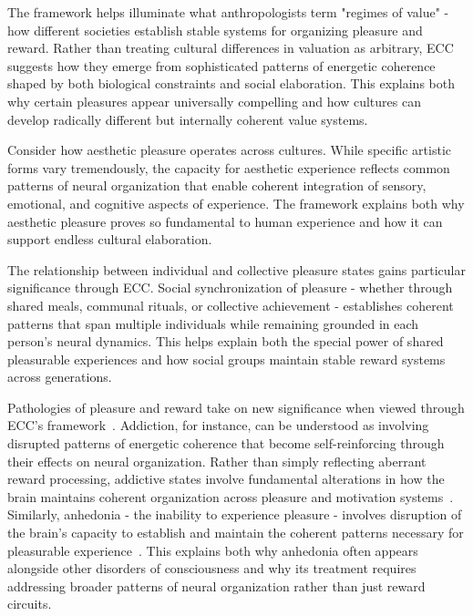 The framework helps illuminate what anthropologists term "regimes of value" - how different societies establish stable systems for organizing pleasure and reward. Rather than treating cultural differences in valuation as arbitrary, ECC suggests how they emerge from sophisticated patterns of energetic coherence shaped by both biological constraints and social elaboration. This explains both why certain pleasures appear universally compelling and how cultures can develop radically different but internally coherent value systems.

Consider how aesthetic pleasure operates across cultures. While specific artistic forms vary tremendously, the capacity for aesthetic experience reflects common patterns of neural organization that enable coherent integration of sensory, emotional, and cognitive aspects of experience. The framework explains both why aesthetic pleasure proves so fundamental to human experience and how it can support endless cultural elaboration.

The relationship between individual and collective pleasure states gains particular significance through ECC. Social synchronization of pleasure - whether through shared meals, communal rituals, or collective achievement - establishes coherent patterns that span multiple individuals while remaining grounded in each person's neural dynamics. This helps explain both the special power of shared pleasurable experiences and how social groups maintain stable reward systems across generations.

Pathologies of pleasure and reward take on new significance when viewed through ECC's framework~\cite{Girdhar2025}. Addiction, for instance, can be understood as involving disrupted patterns of energetic coherence that become self-reinforcing through their effects on neural organization. Rather than simply reflecting aberrant reward processing, addictive states involve fundamental alterations in how the brain maintains coherent organization across pleasure and motivation systems~\cite{levin2020revisiting}. Similarly, anhedonia - the inability to experience pleasure - involves disruption of the brain's capacity to establish and maintain the coherent patterns necessary for pleasurable experience~\cite{vanBoxtel2010, barrett2017emotions}. This explains both why anhedonia often appears alongside other disorders of consciousness and why its treatment requires addressing broader patterns of neural organization rather than just reward circuits.

